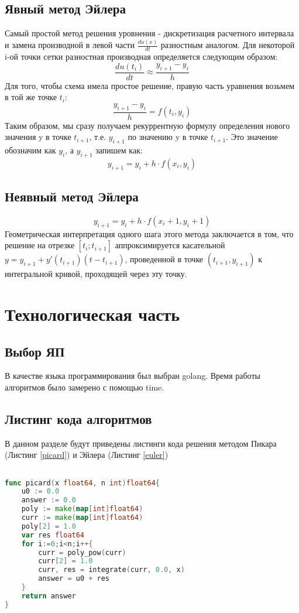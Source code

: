 \documentclass[12pt]{report}
\begin{document}
\section{Явный метод Эйлера}
Самый простой метод решения уровнения - дискретизация расчетного интервала и замена производной в левой части $\frac{du(x)}{dt}$	разностным аналогом. Для некоторой i-ой точки сетки разностная производная определяется следующим образом:
\begin{equation}
\frac{du(t_i)}{dt} \approx \frac{y_{i+1} - y_i}{h}
\end{equation}
Для того, чтобы схема имела простое решение, правую часть уравнения возьмем в той же точке $t_i$:
\begin{equation}
\frac{y_{i+1} - y_i}{h} = f(t_i, y_i)
\end{equation}
Таким образом, мы сразу получаем рекуррентную формулу определения нового значения y в точке $t_{i+1}$, т.е. $y_{i+1}$ по значению y в точке $t_{i+1}$. Это значение обозначим как $y_{i}$, а $y_{i+1}$ запишем как:
\begin{equation}
y_{i+1} = y_i + h \cdot f(x_i,y_i)
\end{equation}
\section{Неявный метод Эйлера}
\begin{equation}
y_{i+1} = y_i + h \cdot f(x_i+1,y_i+1)
\end{equation}
Геометрическая интерпретация  одного шага этого метода заключается в том, что решение на отрезке $[t_i;t_{i+1}]$ аппроксимируется касательной $y = y_{i+1} + y'(t_{i+1})(t-t_{i+1})$, проведенной в точке $(t_{i+1},y_{i+1})$ к интегральной кривой, проходящей через эту точку.
\chapter{Технологическая часть}

\section{Выбор ЯП}
В качестве языка программирования был выбран golang.
Время работы алгоритмов было замерено с помощью time. 
\section{Листинг кода алгоритмов}
В данном разделе будут приведены листинги кода решения методом Пикара (Листинг \ref{picard}) и Эйлера (Листинг \ref{euler})
\begin{lstlisting}[label=picard,caption = Метод Пикара, language = go]

func picard(x float64, n int)float64{
	u0 := 0.0
	answer := 0.0
	poly := make(map[int]float64)
	curr := make(map[int]float64)
	poly[2] = 1.0
	var res float64
	for i:=0;i<n;i++{
		curr = poly_pow(curr)
		curr[2] = 1.0
		curr, res = integrate(curr, 0.0, x)
		answer = u0 + res
	}
	return answer
}
\end{lstlisting}
\end{document}
